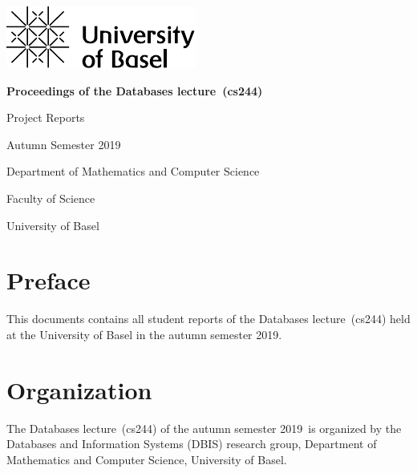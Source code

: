 \documentclass[runningheads,a4paper]{llncs}
\newenvironment{produceProceedings}{}{}
\newcommand{\coursename}{Databases lecture}
\newcommand{\courseacronym}{cs244}
\newcommand{\semester}{autumn semester 2019}
\newcommand{\Semester}{Autumn Semester 2019}
\newcommand{\proceedingsSubtitle}{Project Reports}
\begin{document}
	
\begin{produceProceedings}
	
	\begin{titlepage}
		\includegraphics{UniBas_Logo_EN_Schwarz_RGB_65}
		
		\vspace{80pt}
		
		\centering
		
		\begin{spacing}{2.8}
		{\Huge {} \bfseries Proceedings of the \coursename\ (\courseacronym)}
		\end{spacing}
		
		\vspace{25pt}
		
		{\large \proceedingsSubtitle}
		
		\vspace{50pt}
		
		{\large \Semester}
		
		\vspace{50pt}
		
		{\large	Department of Mathematics and Computer Science}
		
		\vspace{5pt}
		
		{\large Faculty of Science}
		
		\vspace{25pt}
		
		{\large	University of Basel}


	\end{titlepage}
	
	
	\pagestyle{headings}
	\chapter*{Preface}
	This documents contains all student reports of the \coursename\ (\courseacronym) held at the University of Basel in the \semester.
	\chapter*{Organization}
	The \coursename\ (\courseacronym) of the \semester\ is organized by the Databases and Information Systems (DBIS) research group, Department of Mathematics and Computer Science, University of Basel.

\end{produceProceedings}
\end{document}
